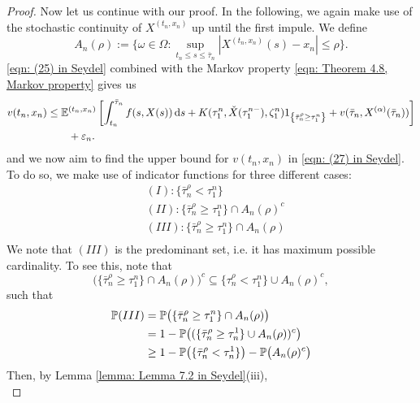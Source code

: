 \begin{proof}
    Now let us continue with our proof. In the following, we again make use of the stochastic continuity of $X^{(t_n,x_n)}$ up until the first impule. We define 
    \begin{equation*}
        A_n(\rho) := \big\{ \omega \in \Omega : \sup_{t_n \leq s \leq \bar \tau_n} |X^{(t_n,x_n)}(s) - x_n| \leq \rho\big\}.
    \end{equation*}
    \eqref{eqn: (25) in Seydel} combined with the Markov property \eqref{eqn: Theorem 4.8, Markov property} gives us
    \begin{align}
        v(t_n,x_n) &\leq \mathbb{E}^{(t_n,x_n)} \left[ \int_{t_n}^{\bar \tau_n} f(s,X(s)) \,\mathrm{d} s + K(\tau_1^n, \check X (\tau_1^{n-}), \zeta_1^n) 1_{\left\{ \bar \tau_n^\rho \geq \tau_1^n\right\}} + v(\bar \tau_n, X^{(\alpha)}(\bar \tau_n)) \right] \nonumber \\
        & \qquad + \varepsilon_n.
        \label{eqn: (27) in Seydel}
    \end{align}
    and we now aim to find the upper bound for $v(t_n,x_n)$ in \eqref{eqn: (27) in Seydel}. To do so, we make use of indicator functions for three different cases:
    \begin{align*}
        &(I): \{\bar \tau_n^\rho < \tau_1^n\} \\
        &(II): \{\bar \tau_n^\rho \geq \tau_1^n \} \cap A_n(\rho)^c \\
        &(III): \{\bar \tau_n^\rho \geq \tau_1^n \} \cap A_n(\rho) \\
    \end{align*}
    We note that $(III)$ is the predominant set, i.e. it has maximum possible cardinality. To see this, note that 
    \begin{equation*}
        \big( \{\bar \tau_n^\rho \geq \tau_1^n \} \cap A_n(\rho) \big)^c \subseteq \{\tau_n^\rho < \tau_1^n \} \cup A_n(\rho)^c,
    \end{equation*}
    such that 
    \begin{align}
        \mathbb{P}(III) &= \mathbb{P} \big( \{ \bar \tau_n^\rho \geq \tau_1^n\} \cap A_n(\rho) \big) \nonumber \\
        &= 1 - \mathbb{P} \big( (\{\bar \tau_n^\rho \geq \tau_n^1\} \cup A_n(\rho))^c \big) \nonumber \\
        & \geq 1 - \mathbb{P}\big( \{\bar \tau_n^\rho < \tau_n^1\} \big) - \mathbb{P}\big(A_n(\rho)^c\big)
        \label{eqn: Theorem 4.8, temporary result 5}
    \end{align}
    Then, by Lemma \ref{lemma: Lemma 7.2 in Seydel}(iii), 
    \begin{equation*}

\end{equation*}
\end{proof}
